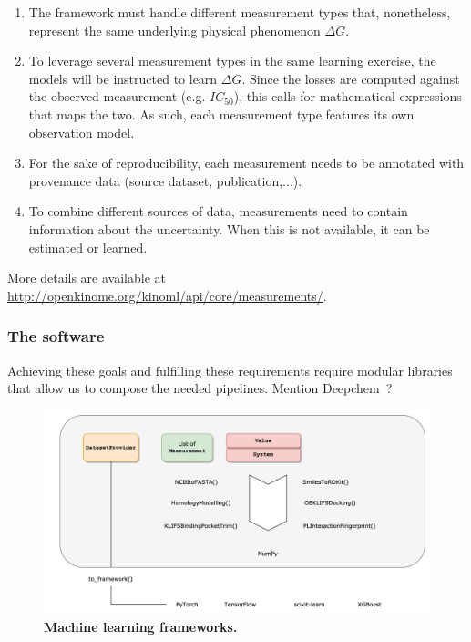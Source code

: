 \documentclass[9pt,lineno]{elife}
\begin{document}
\begin{enumerate}
    \item The framework must handle different measurement types that, nonetheless, represent the same underlying physical phenomenon $\Delta G$.
    \item To leverage several measurement types in the same learning exercise, the models will be instructed to learn $\Delta G$. Since the losses are computed against the observed measurement (e.g. $IC_{50}$), this calls for mathematical expressions that maps the two. As such, each measurement type features its own observation model.
    \item For the sake of reproducibility, each measurement needs to be annotated with provenance data (source dataset, publication,...).
    \item To combine different sources of data, measurements need to contain information about the uncertainty. When this is not available, it can be estimated or learned.
\end{enumerate}

More details are available at \href{http://openkinome.org/kinoml/api/core/measurements/}{http://openkinome.org/kinoml/api/core/measurements/}.




\subsubsection{The software}

Achieving these goals and fulfilling these requirements require modular libraries that allow us to compose the needed pipelines.
Mention Deepchem~\cite{Ramsundar_2019_deepchem}?
\begin{figure}
\centering
\includegraphics[width=0.5\linewidth]{figures/ml_frameworks.png}
\caption{\textbf{Machine learning frameworks.}}
\label{fig:ml_frameworks}
\end{figure}
\end{document}
